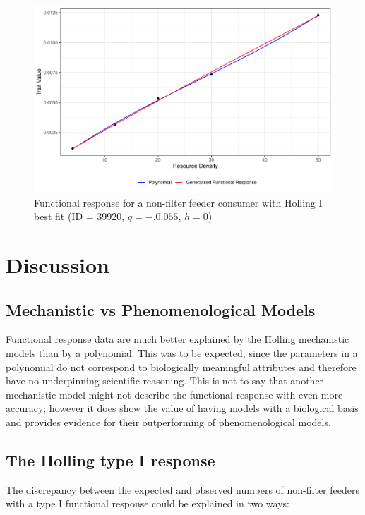 \documentclass[11pt, a4paper, titlepage]{article}
\begin{document}
\begin{figure}[ht!]
	\centering\includegraphics[width=1\textwidth]{../Results/Holling1_example.pdf}
	\caption{Functional response for a non-filter feeder consumer with Holling I best fit (ID = 39920, $q = -.0.055$, $h = 0$)}
\end{figure}




\section{Discussion}

\subsection{Mechanistic vs Phenomenological Models}

Functional response data are much better explained by the Holling mechanistic models than by a polynomial. This was to be expected, since the parameters in a polynomial do not correspond to biologically meaningful attributes and therefore have no underpinning scientific reasoning.
This is not to say that another mechanistic model might not describe the functional response with even more accuracy; however it does show the value of having models with a biological basis and provides evidence for their outperforming of phenomenological models.

\subsection{The Holling type I response}

The discrepancy between the expected and observed numbers of non-filter feeders with a type I functional response could be explained in two ways:
\end{document}
